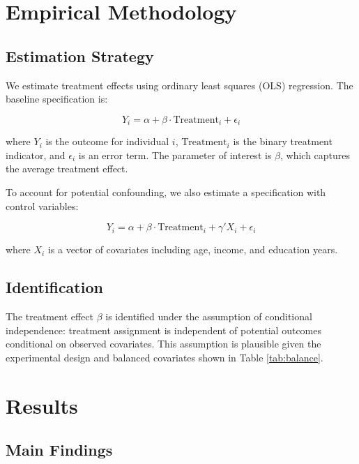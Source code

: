 \documentclass[11pt,letterpaper]{article}
\begin{document}


\section{Empirical Methodology}
\label{sec:methods}

\subsection{Estimation Strategy}

We estimate treatment effects using ordinary least squares (OLS) regression. The baseline specification is:

\begin{equation}
Y_i = \alpha + \beta \cdot \text{Treatment}_i + \epsilon_i
\label{eq:model1}
\end{equation}

where $Y_i$ is the outcome for individual $i$, $\text{Treatment}_i$ is the binary treatment indicator, and $\epsilon_i$ is an error term. The parameter of interest is $\beta$, which captures the average treatment effect.

To account for potential confounding, we also estimate a specification with control variables:

\begin{equation}
Y_i = \alpha + \beta \cdot \text{Treatment}_i + \gamma' X_i + \epsilon_i
\label{eq:model2}
\end{equation}

where $X_i$ is a vector of covariates including age, income, and education years.

\subsection{Identification}

The treatment effect $\beta$ is identified under the assumption of conditional independence: treatment assignment is independent of potential outcomes conditional on observed covariates. This assumption is plausible given the experimental design and balanced covariates shown in Table \ref{tab:balance}.

\section{Results}
\label{sec:results}

\subsection{Main Findings}
\end{document}
